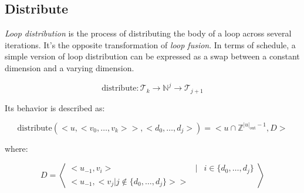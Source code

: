 \documentclass{article}
\begin{document}
\subsection{Distribute}

\emph{Loop distribution} is the process of distributing the body of a loop
across several iterations. It's the opposite transformation of \emph{loop
fusion}. In terms of schedule, a simple version of loop distribution can be
expressed as a swap between a constant dimension and a varying dimension.

\[
    \text{distribute}: \mathcal{T}_k \rightarrow \mathbb{N}^j \rightarrow \mathcal{T}_{j+1}
\]

Its behavior is described as:

\[
    \text{distribute}(< u, <v_0, \ldots, v_k> >, <d_0, \ldots, d_j>) = <u \cap \mathbb{Z}^{|u|_\text{out}-1}, D>
\]

\noindent where:

\[
    D = \left<
    \begin{array}{ccl}
        < u_{-1}, v_i > & | & i \in \{ d_0, \ldots, d_j\} \\
        < u_{-1}, < v_j | j \not\in \{ d_0, \ldots, d_j\}> >  & & 
    \end{array}
    \right>
\]
\end{document}
